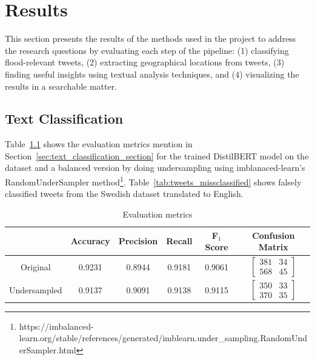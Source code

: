 \chapter{Results}

This section presents the results of the methods used in the project to address the research
questions by evaluating each step of the pipeline: (1) classifying flood-relevant tweets, (2)
extracting geographical locations from tweets, (3) finding useful insights using textual analysis
techniques, and (4) visualizing the results in a searchable matter.

\section{Text Classification}
Table~\ref{tab:metrics} shows the evaluation metrics mention in
Section~\ref{sec:text_classification_section} for the trained DistilBERT model on the dataset and a
balanced version by doing undersampling using imblanaced-learn's RandomUnderSampler
method\footnote{https://imbalanced-learn.org/stable/references/generated/imblearn.under\_sampling.RandomUnderSampler.html}.
Table~\ref{tab:tweets_missclassified} shows falsely classified tweets from the Swedish dataset
translated to English.

\begin{table}
  \center
  \bgroup
  \def\arraystretch{1.5}
  \begin{tabular}{|c|c|c|c|c|c|}
    \hline
            & Accuracy & Precision & Recall & F$_1$ Score & Confusion Matrix\\
            \hline
    Original & 0.9231 & 0.8944 & 0.9181 & 0.9061 &
    $
    \begin{bmatrix}
      381 & 34 \\ 
      568 & 45
    \end{bmatrix}
    $\\
    \hline
    Undersampled & 0.9137 & 0.9091 & 0.9138 & 0.9115 &
    $
    \begin{bmatrix}
      350 & 33\\ 
      370 & 35
    \end{bmatrix}
    $\\
    \hline
  \end{tabular}
  \egroup
  \caption{Evaluation metrics}
  \label{tab:metrics}
\end{table}

